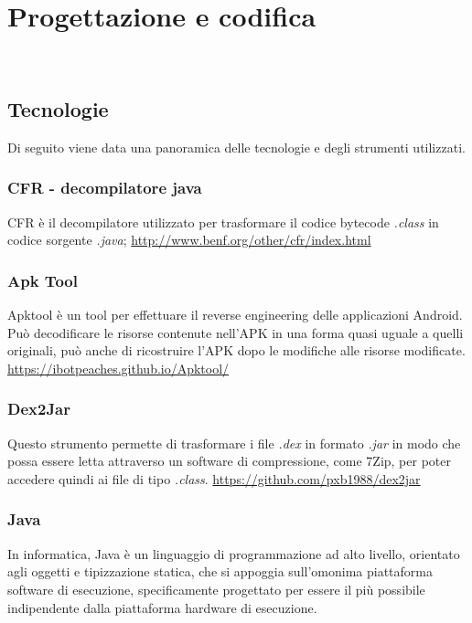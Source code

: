 
\chapter{Progettazione e codifica}
\label{ch:progettazione-e-codifica}

\\

\section{Tecnologie}\label{sec:tecnologie}

Di seguito viene data una panoramica delle tecnologie e degli strumenti utilizzati.

\subsection*{CFR - decompilatore java}
CFR è il decompilatore utilizzato per trasformare il codice bytecode \textit{.class} in codice sorgente \textit{.java};
\url{http://www.benf.org/other/cfr/index.html}

\subsection*{Apk Tool}
Apktool è un tool per effettuare il reverse engineering delle applicazioni Android. Può decodificare le risorse contenute nell'APK in una forma quasi uguale a quelli originali, può anche di ricostruire l'APK dopo le modifiche alle risorse modificate.
\url{https://ibotpeaches.github.io/Apktool/}
\subsection*{Dex2Jar}
Questo strumento permette di trasformare i file \textit{.dex} in formato \textit{.jar} in modo che possa essere letta attraverso un software di compressione, come 7Zip, per poter accedere quindi ai file di tipo \textit{.class}.
\url{https://github.com/pxb1988/dex2jar}


\subsection*{Java}
In informatica, Java è un linguaggio di programmazione ad alto livello, orientato agli oggetti e tipizzazione statica, che si appoggia sull'omonima piattaforma software di esecuzione, specificamente progettato per essere il più possibile indipendente dalla piattaforma hardware di esecuzione.
